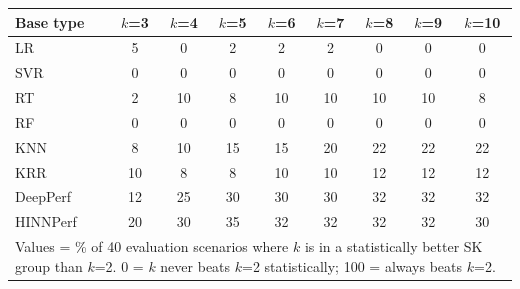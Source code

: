 \begin{tabular}{lcccccccc}
\toprule
Base type & $k$=3 & $k$=4 & $k$=5 & $k$=6 & $k$=7 & $k$=8 & $k$=9 & $k$=10 \\
\midrule
LR & 5 & 0 & 2 & 2 & 2 & 0 & 0 & 0 \\
SVR & 0 & 0 & 0 & 0 & 0 & 0 & 0 & 0 \\
RT & 2 & 10 & 8 & 10 & 10 & 10 & 10 & 8 \\
RF & 0 & 0 & 0 & 0 & 0 & 0 & 0 & 0 \\
KNN & 8 & 10 & 15 & 15 & 20 & 22 & 22 & 22 \\
KRR & 10 & 8 & 8 & 10 & 10 & 12 & 12 & 12 \\
DeepPerf & 12 & 25 & 30 & 30 & 30 & 32 & 32 & 32 \\
HINNPerf & 20 & 30 & 35 & 32 & 32 & 32 & 32 & 30 \\
\bottomrule
\multicolumn{9}{l}{\footnotesize Values = \% of 40 evaluation scenarios where $k$ is in a statistically better SK group than $k$=2. 0 = $k$ never beats $k$=2 statistically; 100 = always beats $k$=2.}} \\
\end{tabular}
